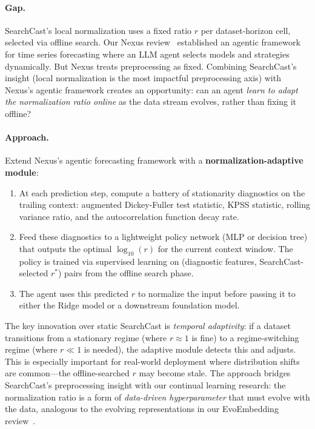 \documentclass[11pt,a4paper]{article}
\begin{document}
\paragraph{Gap.} SearchCast's local normalization uses a fixed ratio $r$ per dataset-horizon cell, selected via offline search. Our Nexus review~\cite{nexus2026} established an agentic framework for time series forecasting where an LLM agent selects models and strategies dynamically. But Nexus treats preprocessing as fixed. Combining SearchCast's insight (local normalization is the most impactful preprocessing axis) with Nexus's agentic framework creates an opportunity: can an agent \emph{learn to adapt the normalization ratio online} as the data stream evolves, rather than fixing it offline?

\paragraph{Approach.} Extend Nexus's agentic forecasting framework with a \textbf{normalization-adaptive module}:
\begin{enumerate}
\item At each prediction step, compute a battery of stationarity diagnostics on the trailing context: augmented Dickey-Fuller test statistic, KPSS statistic, rolling variance ratio, and the autocorrelation function decay rate.
\item Feed these diagnostics to a lightweight policy network (MLP or decision tree) that outputs the optimal $\log_{10}(r)$ for the current context window. The policy is trained via supervised learning on (diagnostic features, SearchCast-selected $r^*$) pairs from the offline search phase.
\item The agent uses this predicted $r$ to normalize the input before passing it to either the Ridge model or a downstream foundation model.
\end{enumerate}
The key innovation over static SearchCast is \emph{temporal adaptivity}: if a dataset transitions from a stationary regime (where $r \approx 1$ is fine) to a regime-switching regime (where $r \ll 1$ is needed), the adaptive module detects this and adjusts. This is especially important for real-world deployment where distribution shifts are common---the offline-searched $r$ may become stale. The approach bridges SearchCast's preprocessing insight with our continual learning research: the normalization ratio is a form of \emph{data-driven hyperparameter} that must evolve with the data, analogous to the evolving representations in our EvoEmbedding review~\cite{li2026evoembedding}.
\end{document}
